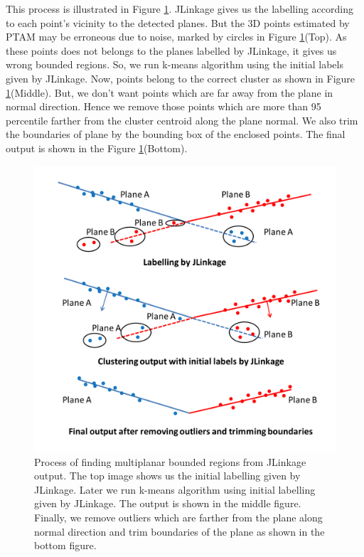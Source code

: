 This process is illustrated in Figure \ref{fig:multiplane}. JLinkage
gives us the labelling according to each point's vicinity to the detected
planes. But the 3D points estimated by PTAM may be erroneous due to noise,
marked by circles in Figure \ref{fig:multiplane}(Top). As these points does not
belongs to the planes labelled by JLinkage, it gives us wrong bounded
regions. So, we run k-means algorithm using the initial labels given by
JLinkage. Now, points  belong to the correct cluster as shown in
Figure \ref{fig:multiplane}(Middle). But, we don't want points which are far
away from the plane in normal direction. Hence we remove those points which
are more than 95 percentile farther from the cluster centroid along the plane
normal. We also trim the boundaries of plane by the bounding box of the
enclosed points. The final output is shown in the Figure
\ref{fig:multiplane}(Bottom).

\begin{figure}[h!]
\centering
\includegraphics[width=\linewidth]{figures/multiplanar/multiplaneDetection}
\caption[Multiple planes detection]{Process of finding multiplanar bounded
regions from JLinkage output.
The top image shows us the initial labelling given by JLinkage. Later we run
k-means algorithm using initial labelling given by JLinkage. The output is shown
in the middle figure. Finally, we remove outliers which are farther from the
plane along normal direction and trim boundaries of the plane as shown in
the bottom figure.}
\label{fig:multiplane}
\end{figure}

